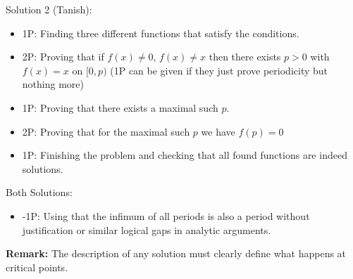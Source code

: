 Solution 2 (Tanish):
\begin{itemize}
\item 1P: Finding three different functions that satisfy the conditions.
\item 2P: Proving that if $f(x)\neq0$, $f(x)\neq x$ then there exists $p > 0$ with $f(x) = x$ on $[0,p)$ (1P can be given if they just prove periodicity but nothing more)
\item 1P: Proving that there exists a maximal such $p$.
\item 2P: Proving that for the maximal such $p$ we have $f(p) = 0$
\item 1P: Finishing the problem and checking that all found functions are indeed solutions.
\end{itemize}

Both Solutions:
\begin{itemize}
\item -1P: Using that the infimum of all periods is also a period without justification or similar logical gaps in analytic arguments.
\end{itemize}

\textbf{Remark:} The description of any solution must clearly define what happens at critical points.